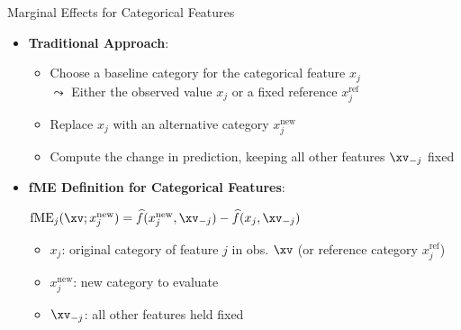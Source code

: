\documentclass[10pt,compress,t,notes=noshow, xcolor=table]{beamer}
\begin{document}
\begin{frame}{Marginal Effects for Categorical Features}
\begin{itemize}
\item \textbf{Traditional Approach}:
\begin{itemize}
  \item Choose a baseline category for the categorical feature \(x_j\) \\
  $\leadsto$ Either the observed value \(x_j\) or a fixed reference \(x_j^\text{ref}\)
  \item Replace \(x_j\) with an alternative category \(x_j^\text{new}\)
  \item Compute the change in prediction, keeping all other features \(\xv_{-j}\) fixed
\end{itemize}

\item \textbf{fME Definition for Categorical Features}:\\
\medskip
\centerline{$
\text{fME}_j(\xv; x_j^\text{new}) = \widehat{f}(x_j^\text{new}, \xv_{-j}) - \widehat{f}(x_j, \xv_{-j})$}
\medskip
\begin{itemize}
\item \(x_j\): original category of feature \(j\) in obs. \(\xv\) (or reference category $x_j^\text{ref}$)
\item \(x_j^\text{new}\): new category to evaluate
\item \(\xv_{-j}\): all other features held fixed
\end{itemize}


\end{itemize}
\end{frame}
\end{document}
